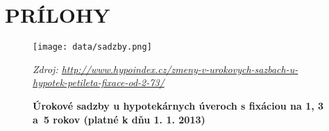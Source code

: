 \documentclass[12pt,twoside,openany]{fithesis}
\makeatletter
\def\cleardoublepage{\clearpage\if@twoside \ifodd\c@page\else
        \thispagestyle{empty}
        \hbox{}\newpage\if@twocolumn\hbox{}\newpage\fi\fi\fi}
\makeatother
\begin{document}
\listoftables

			\newpage
								
																	
{}
\normalsize

\renewcommand\listfigurename {\textbf{\uppercase{Zoznam prÍloh}}}

\listoffigures

\normalsize


\appendix

		\cleardoublepage\chapter*{\uppercase{PrÍlohy}}

{}
		
\renewcommand{\figurename}{Príloha}
\begin{figure}[h!]
\centering
\caption{\textbf{Úrokové sadzby u hypotekárnych úveroch s fixáciou na 1, 3 a~5 rokov (platné k dňu 1. 1. 2013)}}
\texttt{[image: data/sadzby.png]}

\emph{\footnotesize Zdroj:  \href{http://www.hypoindex.cz/zmeny-v-urokovych-sazbach-u-hypotek-petileta-fixace-od-2-73/}
 {http://www.hypoindex.cz/zmeny-v-urokovych-sazbach-u-hypotek-petileta-fixace-od-2-73/} }
 \normalsize

\label{sadzby}
\end{figure}
\end{document}
